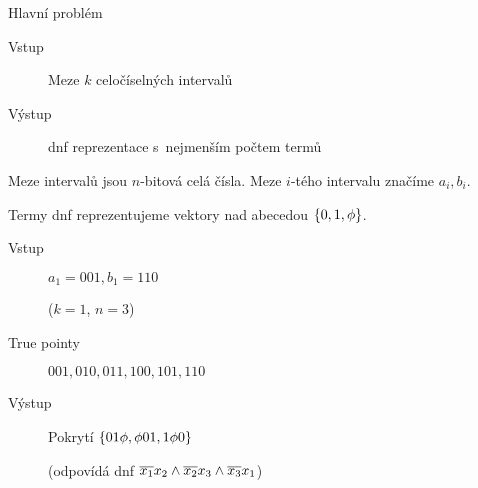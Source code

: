 \documentclass{beamer}
\theoremstyle{remark}
\begin{document}

\begin{frame}
\titlepage
\end{frame}



\begin{frame}{Hlavní problém}

\begin{problem}
\begin{description}
\item[Vstup]
Meze $k$ celočíselných intervalů

\item[Výstup]
\acrshort{dnf} reprezentace s~nejmenším počtem termů
\end{description}
\end{problem}

Meze intervalů jsou $n$-bitová celá čísla.
Meze $i$-tého intervalu značíme $a_i, b_i$.

Termy \acrshort{dnf} reprezentujeme vektory nad abecedou $\{0, 1, \phi\}$.

\begin{example}
\begin{description}
\item[Vstup] $a_1 = 001, b_1 = 110$

($k=1$, $n=3$)


\item[True pointy]
$001, 010, 011, 100, 101, 110$

\item[Výstup]
Pokrytí $\{01 \phi, \phi 01, 1 \phi 0\}$

(odpovídá \acrshort{dnf}
$\overline{x_1} x_2
\wedge
\overline{x_2} x_3
\wedge \overline{x_3} x_1$)
\end{description}
\end{example}

\end{frame}
\end{document}
